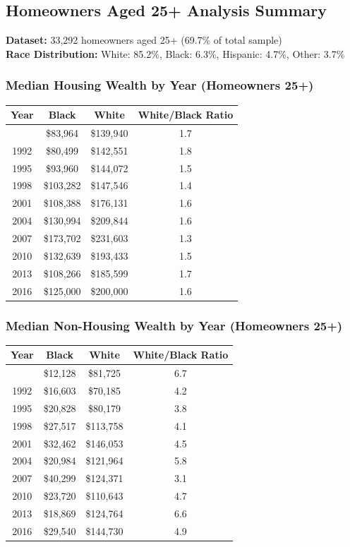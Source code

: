 \documentclass[
  12pt]{article}
\begin{document}
\subsection{Homeowners Aged 25+ Analysis
Summary}\label{homeowners-aged-25-analysis-summary}

\textbf{Dataset:} 33,292 homeowners aged 25+ (69.7\% of total sample)\\
\textbf{Race Distribution:} White: 85.2\%, Black: 6.3\%, Hispanic:
4.7\%, Other: 3.7\%

\subsubsection{Median Housing Wealth by Year (Homeowners
25+)}\label{median-housing-wealth-by-year-homeowners-25}

\begin{longtable}[]{@{}cccc@{}}
\toprule\noalign{}
Year & Black & White & White/Black Ratio \\
\midrule\noalign{}
\endhead
\bottomrule\noalign{}
\endlastfoot
1989 & \$83,964 & \$139,940 & 1.7 \\
1992 & \$80,499 & \$142,551 & 1.8 \\
1995 & \$93,960 & \$144,072 & 1.5 \\
1998 & \$103,282 & \$147,546 & 1.4 \\
2001 & \$108,388 & \$176,131 & 1.6 \\
2004 & \$130,994 & \$209,844 & 1.6 \\
2007 & \$173,702 & \$231,603 & 1.3 \\
2010 & \$132,639 & \$193,433 & 1.5 \\
2013 & \$108,266 & \$185,599 & 1.7 \\
2016 & \$125,000 & \$200,000 & 1.6 \\
\end{longtable}

\subsubsection{Median Non-Housing Wealth by Year (Homeowners
25+)}\label{median-non-housing-wealth-by-year-homeowners-25}

\begin{longtable}[]{@{}cccc@{}}
\toprule\noalign{}
Year & Black & White & White/Black Ratio \\
\midrule\noalign{}
\endhead
\bottomrule\noalign{}
\endlastfoot
1989 & \$12,128 & \$81,725 & 6.7 \\
1992 & \$16,603 & \$70,185 & 4.2 \\
1995 & \$20,828 & \$80,179 & 3.8 \\
1998 & \$27,517 & \$113,758 & 4.1 \\
2001 & \$32,462 & \$146,053 & 4.5 \\
2004 & \$20,984 & \$121,964 & 5.8 \\
2007 & \$40,299 & \$124,371 & 3.1 \\
2010 & \$23,720 & \$110,643 & 4.7 \\
2013 & \$18,869 & \$124,764 & 6.6 \\
2016 & \$29,540 & \$144,730 & 4.9 \\
\end{longtable}
\end{document}
